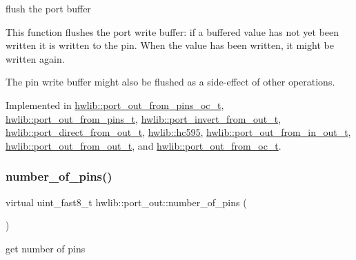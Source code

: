 flush the port buffer

This function flushes the port write buffer\+: if a buffered value has not yet been written it is written to the pin. When the value has been written, it might be written again.

The pin write buffer might also be flushed as a side-\/effect of other operations. 

Implemented in \hyperlink{classhwlib_1_1port__out__from__pins__oc__t_acdd899bd1428f01cca081a76a5bc7475}{hwlib\+::port\+\_\+out\+\_\+from\+\_\+pins\+\_\+oc\+\_\+t}, \hyperlink{classhwlib_1_1port__out__from__pins__t_a668e38b7d53d73d6ca3503ec4aa71bda}{hwlib\+::port\+\_\+out\+\_\+from\+\_\+pins\+\_\+t}, \hyperlink{classhwlib_1_1port__invert__from__out__t_ad0a8249cec2ce5698ea3a41b19240ed5}{hwlib\+::port\+\_\+invert\+\_\+from\+\_\+out\+\_\+t}, \hyperlink{classhwlib_1_1port__direct__from__out__t_a6fab0d2c9bdf82590bd385bbaadf6bc3}{hwlib\+::port\+\_\+direct\+\_\+from\+\_\+out\+\_\+t}, \hyperlink{classhwlib_1_1hc595_a89801264883c79926fd9f0983662e50a}{hwlib\+::hc595}, \hyperlink{classhwlib_1_1port__out__from__in__out__t_a568ad753e6063bca9ecea4afe5d941b2}{hwlib\+::port\+\_\+out\+\_\+from\+\_\+in\+\_\+out\+\_\+t}, \hyperlink{classhwlib_1_1port__out__from__out__t_ab9caf29db8ef90afa7dfd645fd4f89f0}{hwlib\+::port\+\_\+out\+\_\+from\+\_\+out\+\_\+t}, and \hyperlink{classhwlib_1_1port__out__from__oc__t_ae85b5828e71f11c12bfe78b54afb2088}{hwlib\+::port\+\_\+out\+\_\+from\+\_\+oc\+\_\+t}.

\mbox{\label{classhwlib_1_1port__out_a8593e2ff755b938797defb06c1e085df}} 
\subsubsection{\texorpdfstring{number\+\_\+of\+\_\+pins()}{number\_of\_pins()}}
{\footnotesize\ttfamily virtual uint\+\_\+fast8\+\_\+t hwlib\+::port\+\_\+out\+::number\+\_\+of\+\_\+pins (\begin{DoxyParamCaption}{ }\end{DoxyParamCaption})\hspace{0.3cm}{\ttfamily [pure virtual]}}





get number of pins

